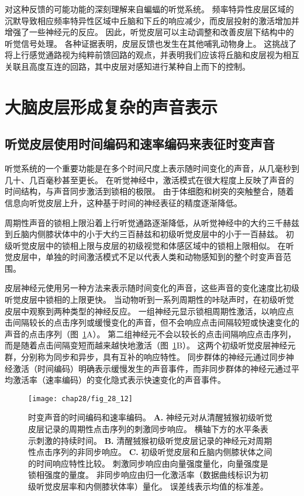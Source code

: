 对这种反馈的可能功能的深刻理解来自蝙蝠的听觉系统。
频率特异性皮层区域的沉默导致相应频率特异性区域中丘脑和下丘的响应减少，而皮层投射的激活增加并增强了一些神经元的反应。
因此，听觉皮层可以主动调整和改善皮层下结构中的听觉信号处理。
各种证据表明，皮层反馈也发生在其他哺乳动物身上。
这挑战了将上行感觉通路视为纯粹前馈回路的观点，并表明我们应该将丘脑和皮层视为相互关联且高度互连的回路，其中皮层对感知进行某种自上而下的控制。



\section{大脑皮层形成复杂的声音表示}


\subsection{听觉皮层使用时间编码和速率编码来表征时变声音}

听觉系统的一个重要功能是在多个时间尺度上表示随时间变化的声音，从几毫秒到几十、几百毫秒甚至更长。
在听觉神经中，激活模式在很大程度上反映了声音的时间结构，与声音同步激活到锁相的极限。
由于体细胞和树突的突触整合，随着信息向听觉皮层上升，这种基于时间的神经表征的精度逐渐降低。


周期性声音的锁相上限沿着上行听觉通路逐渐降低，从听觉神经中的大约三千赫兹到丘脑内侧膝状体中的小于大约三百赫兹和初级听觉皮层中的小于一百赫兹。
初级听觉皮层中的锁相上限与皮层的初级视觉和体感区域中的锁相上限相似。
在听觉皮层中，单独的时间激活模式不足以代表人类和动物感知到的整个时变声音范围。


皮层神经元使用另一种方法来表示随时间变化的声音，这些声音的变化速度比初级听觉皮层中锁相的上限更快。
当动物听到一系列周期性的咔哒声时，在初级听觉皮层中观察到两种类型的神经反应。
一组神经元显示锁相周期性激活，以响应点击间隔较长的点击序列或缓慢变化的声音，但不会响应点击间隔较短或快速变化的声音的点击序列（图~\ref{fig:28_12}A）。
第二组神经元不会以较长的点击间隔响应点击序列，而是随着点击间隔变短而越来越快地激活（图~\ref{fig:28_12}B）。
这两个初级听觉皮层神经元群，分别称为同步和异步，具有互补的响应特性。
同步群体的神经元通过同步神经激活（时间编码）明确表示缓慢发生的声音事件，而非同步群体的神经元通过平均激活率（速率编码）的变化隐式表示快速变化的声音事件。


\begin{figure}[htbp]
	\centering
	\texttt{[image: chap28/fig\_28\_12]}
	\caption{时变声音的时间编码和速率编码。
	\textbf{A.} 神经元对从清醒狨猴初级听觉皮层记录的周期性点击序列的刺激同步响应。
	横轴下方的水平条表示刺激的持续时间\cite{lu2001temporal}。
	\textbf{B.} 清醒狨猴初级听觉皮层记录的神经元对周期性点击序列的非同步响应\cite{lu2001temporal}。
	\textbf{C.} 初级听觉皮层和丘脑内侧膝状体之间的时间响应特性比较。
	刺激同步响应由向量强度量化，向量强度是锁相强度的量度。
	非同步响应由归一化激活率（数据曲线标识为初级听觉皮层率和内侧膝状体率）量化。
	误差线表示均值的标准差\cite{bartlett2007neural}。}
	\label{fig:28_12}
\end{figure}



